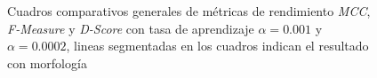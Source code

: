 \begin{figure}[!ht]
\caption[Cuadros comparativos métricas de rendimiento de MCC, F-Measure, y D-Score ($\alpha=0.001$ y $\alpha=0.0002$).]{Cuadros comparativos generales de métricas de rendimiento \textit{MCC}, \textit{F-Measure} y \textit{D-Score} con tasa de aprendizaje $\alpha=0.001$ y $\alpha=0.0002$, lineas segmentadas en los cuadros indican el resultado con morfología}
\label{fig:pe_metricas_1}
\end{figure}


